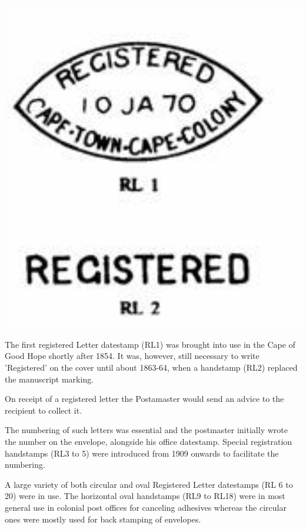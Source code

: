 \begin{marginfigure}
\includegraphics[width=1.0\textwidth]{../cape-of-good-hope/clip_image002_0000.jpg}
\end{marginfigure}

The first registered Letter datestamp  (RL1) was brought into 
use in the Cape of Good Hope shortly after 1854. It was, however, 
still necessary to write 'Registered' on the cover until about 1863-64, 
when a handstamp (RL2) replaced the manuscript marking.

On receipt of a registered letter the Postamaster would send an 
advice to the recipient to collect it.



The numbering of such letters was essential and the postmaster 
initially wrote the number on the envelope, alongside his office 
datestamp. Special registration handstamps (RL3 to 5) were 
introduced from 1909 onwards to facilitate the numbering.

  

A large variety of both circular and oval Registered Letter 
datestamps (RL 6 to 20) were in use. The horizontal oval 
handstamps (RL9 to RL18) were in most general use in colonial 
post offices for canceling adhesives whereas the circular ones 
were mostly used for back stamping of envelopes.
 
